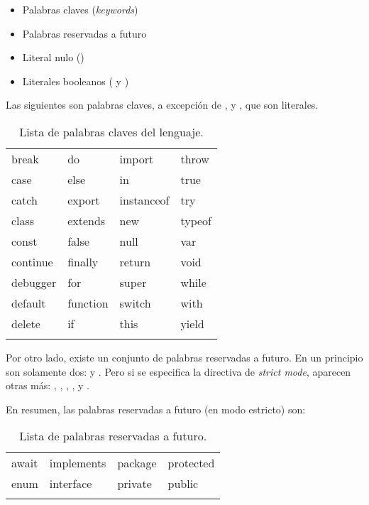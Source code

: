 \begin{itemize}
\item Palabras claves (\textit{keywords})
\item Palabras reservadas a futuro
\item Literal nulo ()
\item Literales booleanos ( y )
\end{itemize}

Las siguientes son palabras claves, a excepción de ,  y , que son literales.

\begin{table}[!h]
\caption{Lista de palabras claves del lenguaje.}
\label{tab:reservedkeywords}
\centering
\begin{tabular}{l l l l}
\toprule
break & do & import & throw\\
case & else & in & true\\
catch & export & instanceof & try\\
class & extends & new & typeof\\
const & false & null & var\\
continue & finally & return & void\\
debugger & for & super & while\\
default & function & switch & with\\
delete & if & this & yield\\
\bottomrule\\
\end{tabular}
\end{table}

Por otro lado, existe un conjunto de palabras reservadas a futuro. En un principio son solamente dos:  y . Pero si se especifica la directiva de \textit{strict mode}, aparecen otras más: , , , ,  y .

En resumen, las palabras reservadas a futuro (en modo estricto) son:

\begin{table}[!h]
\caption{Lista de palabras reservadas a futuro.}
\label{tab:futurereservedkeywords}
\centering
\begin{tabular}{l l l l}
\toprule
await & implements & package & protected\\
enum & interface & private & public\\
\bottomrule\\
\end{tabular}
\end{table}

